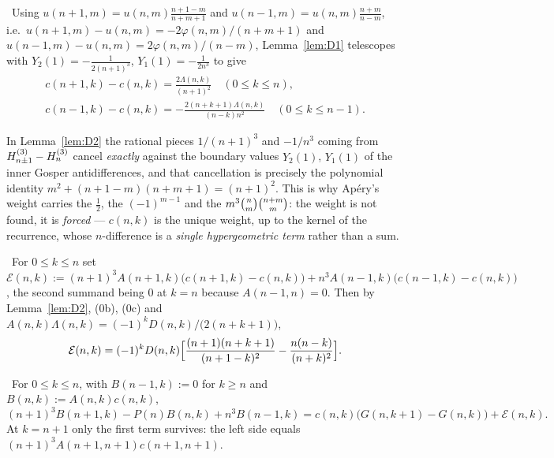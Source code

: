 \begin{lemma}\label{lem:D2}
\Proved\ Using $u(n+1,m)=u(n,m)\frac{n+1-m}{n+m+1}$ and $u(n-1,m)=u(n,m)\frac{n+m}{n-m}$,
i.e.\ $u(n+1,m)-u(n,m)=-2\varphi(n,m)/(n+m+1)$ and
$u(n-1,m)-u(n,m)=2\varphi(n,m)/(n-m)$, Lemma~\ref{lem:D1} telescopes with
$Y_2(1)=-\tfrac1{2(n+1)^3}$, $Y_1(1)=-\tfrac1{2n^3}$ to give
\[
 \begin{gathered}
   c(n+1,k)-c(n,k)=\frac{2\Lambda(n,k)}{(n+1)^2}\quad(0\le k\le n),\\
   c(n-1,k)-c(n,k)=-\frac{2(n+k+1)\Lambda(n,k)}{(n-k)n^2}\quad(0\le k\le n-1).
 \end{gathered}
\]
\end{lemma}

\begin{remark}\label{rem:miracle}
In Lemma~\ref{lem:D2} the rational pieces $1/(n+1)^3$ and $-1/n^3$ coming from
$H^{(3)}_{n\pm1}-H^{(3)}_{n}$ cancel \emph{exactly} against the boundary values $Y_2(1)$, $Y_1(1)$
of the inner Gosper antidifferences, and that cancellation is precisely the polynomial
identity $m^2+(n+1-m)(n+m+1)=(n+1)^2$. This is why Ap\'ery's weight carries the $\tfrac12$,
the $(-1)^{m-1}$ and the $m^3\binom{n}{m}\binom{n+m}{m}$: the weight is not found, it is
\emph{forced} --- $c(n,k)$ is the unique weight, up to the kernel of the recurrence, whose
$n$-difference is a \emph{single hypergeometric term} rather than a sum.
\end{remark}

\begin{lemma}\label{lem:D3}
\Proved\ For $0\le k\le n$ set
$\mathcal E(n,k):=(n+1)^3A(n+1,k)\bigl(c(n+1,k)-c(n,k)\bigr)+n^3A(n-1,k)\bigl(c(n-1,k)-c(n,k)\bigr)$,
the second summand being $0$ at $k=n$ because $A(n-1,n)=0$. Then by Lemma~\ref{lem:D2},
(0b), (0c) and $A(n,k)\Lambda(n,k)=(-1)^kD(n,k)/\bigl(2(n+k+1)\bigr)$,
\[
   \mathcal E(n,k)=(-1)^kD(n,k)\Bigl[\frac{(n+1)(n+k+1)}{(n+1-k)^2}-\frac{n(n-k)}{(n+k)^2}\Bigr].
\]
\end{lemma}

\begin{proposition}\label{prop:D4}
\Proved\ For $0\le k\le n$, with $B(n-1,k):=0$ for $k\ge n$ and $B(n,k):=A(n,k)c(n,k)$,
\[
   (n+1)^3B(n+1,k)-P(n)B(n,k)+n^3B(n-1,k)
   =c(n,k)\bigl(G(n,k+1)-G(n,k)\bigr)+\mathcal E(n,k).
\]
At $k=n+1$ only the first term survives: the left side equals
$(n+1)^3A(n+1,n+1)c(n+1,n+1)$.
\end{proposition}

